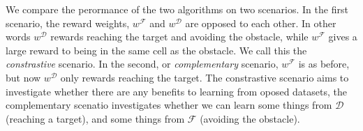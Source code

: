 \documentclass[letterpaper]{article}
\begin{document}
We compare the perormance of the two algorithms on two scenarios. In the first scenario, the reward weights, $w^{\mathcal{F}}$ and $w^{\mathcal{D}}$ are opposed to each other. In other words $w^{\mathcal{D}}$ rewards reaching the target and avoiding the obstacle, while $w^{\mathcal{F}}$ gives a large reward to being in the same cell as the obstacle. We call this the \emph{constrastive} scenario. In the second, or \emph{complementary} scenario, $w^{\mathcal{F}}$ is as before, but now $w^{\mathcal{D}}$ only rewards reaching the target. The constrastive scenario aims to investigate whether there are any benefits to learning from oposed datasets, the complementary scenatio investigates whether we can learn some things from $\mathcal{D}$ (reaching a target), and some things from $\mathcal{F}$ (avoiding the obstacle). 



\end{document}
